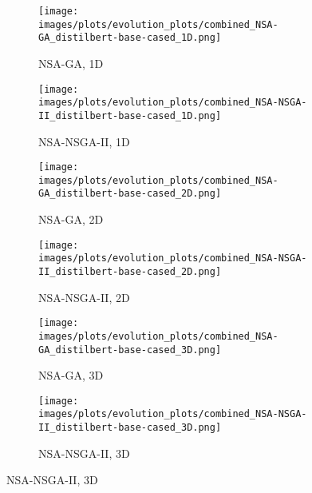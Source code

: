 
        \begin{figure}[htbp]
        \centering    \begin{subfigure}[b]{0.40\textwidth}
        \texttt{[image: images/plots/evolution\_plots/combined\_NSA-GA\_distilbert-base-cased\_1D.png]}
        \caption{\scriptsize NSA-GA, 1D}
        \label{subfig:distilbert-base-cased_NSA-GA_1D}
        \end{subfigure}\hspace{0.05\textwidth}
    \begin{subfigure}[b]{0.40\textwidth}
        \texttt{[image: images/plots/evolution\_plots/combined\_NSA-NSGA-II\_distilbert-base-cased\_1D.png]}
        \caption{\scriptsize NSA-NSGA-II, 1D}
        \label{subfig:distilbert-base-cased_NSA-NSGA-II_1D}
        \end{subfigure}

    \vspace{0.2cm}
    \begin{subfigure}[b]{0.40\textwidth}
        \texttt{[image: images/plots/evolution\_plots/combined\_NSA-GA\_distilbert-base-cased\_2D.png]}
        \caption{\scriptsize NSA-GA, 2D}
        \label{subfig:distilbert-base-cased_NSA-GA_2D}
        \end{subfigure}\hspace{0.05\textwidth}
    \begin{subfigure}[b]{0.40\textwidth}
        \texttt{[image: images/plots/evolution\_plots/combined\_NSA-NSGA-II\_distilbert-base-cased\_2D.png]}
        \caption{\scriptsize NSA-NSGA-II, 2D}
        \label{subfig:distilbert-base-cased_NSA-NSGA-II_2D}
        \end{subfigure}

    \vspace{0.2cm}
    \begin{subfigure}[b]{0.40\textwidth}
        \texttt{[image: images/plots/evolution\_plots/combined\_NSA-GA\_distilbert-base-cased\_3D.png]}
        \caption{\scriptsize NSA-GA, 3D}
        \label{subfig:distilbert-base-cased_NSA-GA_3D}
        \end{subfigure}\hspace{0.05\textwidth}
    \begin{subfigure}[b]{0.40\textwidth}
        \texttt{[image: images/plots/evolution\_plots/combined\_NSA-NSGA-II\_distilbert-base-cased\_3D.png]}
        \caption{\scriptsize NSA-NSGA-II, 3D}
        \label{subfig:distilbert-base-cased_NSA-NSGA-II_3D}
        \end{subfigure}


\end{figure}

